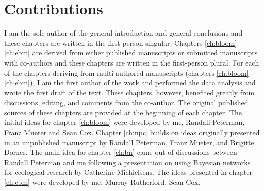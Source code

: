 \section{Contributions}

I am the sole author of the general introduction and general conclusions and
these chapters are written in the first-person singular. Chapters
\ref{ch:bloom}--\ref{ch:ebm} are derived from either published manuscripts or
submitted manuscripts with co-authors and these chapters are written in the
first-person plural. For each of the chapters deriving from multi-authored
manuscripts (chapters \ref{ch:bloom}--\ref{ch:ebm}), I am the first author of
the work and performed the data analysis and wrote the first draft of the text.
These chapters, however, benefited greatly from discussions, editing, and
comments from the co-author. The original published sources of these chapters
are provided at the beginning of each chapter. The initial ideas for chapter
\ref{ch:bloom} were developed by me, Randall Peterman, Franz Mueter and Sean
Cox. Chapter \ref{ch:npc} builds on ideas originally presented in an unpublished
manuscript by Randall Peterman, Franz Mueter, and Brigitte Dorner. The main idea
for chapter \ref{ch:bn} came out of discussions between Randall Peterman and me
following a presentation on using Bayesian networks for ecological research by
Catherine Michielsens. The ideas presented in chapter \ref{ch:ebm} were
developed by me, Murray Rutherford, Sean Cox.

